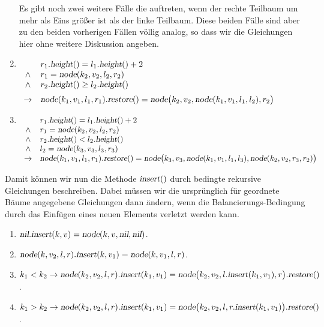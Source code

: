 \begin{enumerate}
      Es gibt noch zwei weitere F\"alle die auftreten, wenn der rechte Teilbaum um mehr als
      Eins gr\"o{\ss}er ist als der linke Teilbaum.  Diese beiden F\"alle sind aber zu den beiden
      vorherigen F\"allen v\"ollig analog, so dass wir die Gleichungen hier ohne weitere
      Diskussion angeben.
\item $\begin{array}[t]{cl}
              & r_1.\textsl{height}() = l_1.\textsl{height}() + 2    \\ 
       \wedge & r_1 = \textsl{node}(k_2,v_2,l_2,r_2)               \\
       \wedge & r_2.\textsl{height}() \geq l_2.\textsl{height}()     \\[0.2cm]
       \rightarrow & \textsl{node}(k_1,v_1,l_1,r_1).\textsl{restore}() = 
                     \textsl{node}\bigl(k_2,v_2,\textsl{node}(k_1,v_1,l_1,l_2),r_2\bigr)
       \end{array}
      $
\item $\begin{array}[t]{cl}
               & r_1.\textsl{height}() = l_1.\textsl{height}() + 2    \\ 
        \wedge & r_1 = \textsl{node}(k_2,v_2,l_2,r_2)               \\
        \wedge & r_2.\textsl{height}() < l_2.\textsl{height}()     \\
        \wedge & l_2 = \textsl{node}(k_3,v_3,l_3,r_3)               \\
        \rightarrow & \textsl{node}(k_1,v_1,l_1,r_1).\textsl{restore}() = 
                      \textsl{node}\bigl(k_3,v_3,\textsl{node}(k_1,v_1,l_1,l_3),\textsl{node}(k_2,v_2,r_3,r_2) \bigr)
        \end{array}
       $

\end{enumerate}
Damit k\"onnen wir nun die Methode $\textsl{insert}()$ durch bedingte rekursive Gleichungen 
beschreiben.  Dabei m\"ussen wir die urspr\"unglich f\"ur geordnete B\"aume angegebene Gleichungen
dann \"andern, wenn die Balancierungs-Bedingung durch das Einf\"ugen eines neuen Elements
verletzt werden kann.
\begin{enumerate}
\item $\textsl{nil}\mathtt{.}\textsl{insert}(k,v) = \textsl{node}(k,v, \textsl{nil}, \textsl{nil})$.  
\item $\textsl{node}(k, v_2, l, r)\mathtt{.}\textsl{insert}(k,v_1) = \textsl{node}(k, v_1, l, r)$.
\item $k_1 < k_2 \rightarrow 
          \textsl{node}(k_2, v_2, l, r)\mathtt{.}\textsl{insert}(k_1, v_1) =
          \textsl{node}\bigl(k_2, v_2, l\mathtt{.}\textsl{insert}(k_1, v_1), r\bigr).\textsl{restore}()$.
\item $k_1 > k_2 \rightarrow 
         \textsl{node}(k_2, v_2, l, r)\mathtt{.}\textsl{insert}(k_1, v_1) = 
         \textsl{node}\bigl(k_2, v_2, l, r\mathtt{.}\textsl{insert}(k_1, v_1)\bigr).\textsl{restore}()$.
\end{enumerate}
